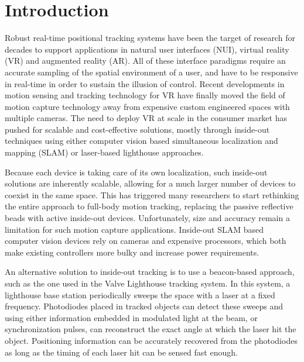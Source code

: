 \documentclass[sigchi-a]{acmart}
\begin{document}




\maketitle

\section{Introduction}
Robust real-time positional tracking systems have been the target of research for decades to support applications in natural user interfaces (NUI), virtual reality (VR) and augmented reality (AR). All of these interface paradigms require an accurate sampling of the spatial environment of a user, and have to be responsive in real-time in order to sustain the illusion of control. Recent developments in motion sensing and tracking technology for VR have finally moved the field of motion capture technology away from expensive custom engineered spaces with multiple cameras. The need to deploy VR at scale in the consumer market has pushed for scalable and cost-effective solutions, mostly through inside-out techniques using either computer vision based simultaneous localization and mapping (SLAM) or laser-based lighthouse approaches.

Because each device is taking care of its own localization, such inside-out solutions are inherently scalable, allowing for a much larger number of devices to coexist in the same space. This has triggered many researchers to start rethinking the entire approach to full-body motion tracking, replacing the passive reflective beads with active inside-out devices. Unfortunately, size and accuracy remain a limitation for such motion capture applications. Inside-out SLAM based computer vision devices rely on cameras and expensive processors, which both make existing controllers more bulky and increase power requirements.

An alternative solution to inside-out tracking is to use a beacon-based approach, such as the one used in the Valve Lighthouse tracking system. In this system, a lighthouse base station periodically sweeps the space with a laser at a fixed frequency. Photodiodes placed in tracked objects can detect these sweeps and using either information embedded in modulated light at the beam, or synchronization pulses, can reconstruct the exact angle at which the laser hit the object. Positioning information can be accurately recovered from the photodiodes as long as the timing of each laser hit can be sensed fast enough.
\end{document}
